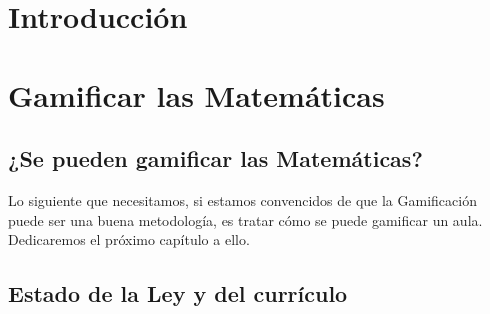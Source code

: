 \documentclass[a4paper, 12pt]{book}
\renewcommand{\BOthers}[1]{et al.\hbox{}}%
\renewcommand{\BOthers}[1]{et al.\hbox{}}%
\renewcommand{\BOthers}[1]{et al.\hbox{}}%
\renewcommand{\BOthers}[1]{et al.\hbox{}}%
\begin{document}
\renewcommand{\BOthers}[1]{et al.\hbox{}}
\renewcommand{\BAvailFrom}[1]{Recuperado de\hbox{}}
\renewcommand{\BRetrievedFrom}[1]{Recuperado de }
\renewcommand{\BRetrieved}[1]{}






\cleardoublepage
\pagestyle{fancy}
\chapter{Introducción}






\cleardoublepage
\chapter{Gamificar las Matemáticas}

\section{¿Se pueden gamificar las Matemáticas?}

Lo siguiente que necesitamos, si estamos convencidos de que la Gamificación puede ser una buena metodología, es tratar cómo se puede gamificar un aula.
%
Dedicaremos el próximo capítulo a ello.

\section{Estado de la Ley y del currículo}
\end{document}
